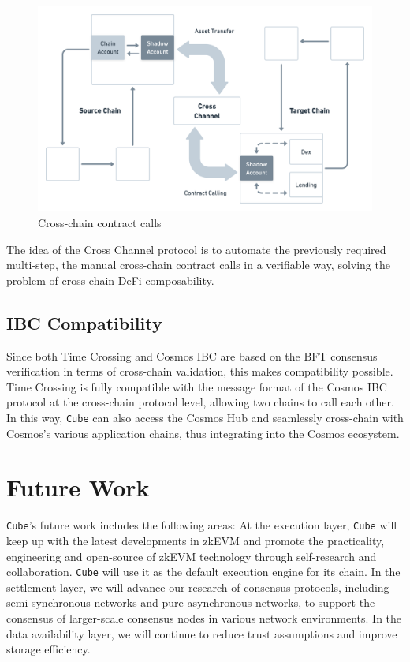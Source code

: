 \documentclass{iacrtrans}
\begin{document}
\begin{figure}[h]
	\centering
	\includegraphics[width=\textwidth]{images/10.png}
	\caption{Cross-chain contract calls}
	\label{fig:10} 
\end{figure}

The idea of the Cross Channel protocol is to automate the previously required multi-step, the manual cross-chain contract calls in a verifiable way, solving the problem of cross-chain DeFi composability. 


\subsection{IBC Compatibility}
Since both Time Crossing and Cosmos IBC are based on the BFT consensus verification in terms of cross-chain validation, this makes compatibility possible. Time Crossing is fully compatible with the message format of the Cosmos IBC protocol at the cross-chain protocol level, allowing two chains to call each other. In this way, \texttt{Cube} can also access the Cosmos Hub and seamlessly cross-chain with Cosmos's various application chains, thus integrating into the Cosmos ecosystem.


\section{Future Work}
\texttt{Cube}'s future work includes the following areas:
At the execution layer, \texttt{Cube} will keep up with the latest developments in zkEVM and promote the practicality, engineering and open-source of zkEVM technology through self-research and collaboration. \texttt{Cube} will use it as the default execution engine for its chain. 
In the settlement layer, we will advance our research of consensus protocols, including semi-synchronous networks and pure asynchronous networks, to support the consensus of larger-scale consensus nodes in various network environments. 
In the data availability layer, we will continue to reduce trust assumptions and improve storage efficiency.
\end{document}
